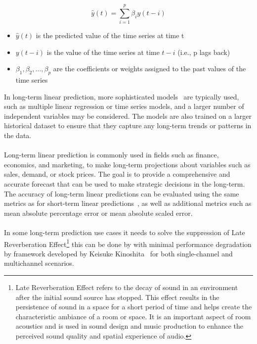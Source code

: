     \begin{equation} \label{eq:ltlp}
        \hat{y}(t) = \sum_{i=1}^{p} \beta_i y(t-i)
    \end{equation}
    \begin{itemize}
        \item $\hat{y}(t)$ is the predicted value of the time series at time t
        \item $y(t-i)$ is the value of the time series at time $t-i$ (i.e., p lags back)
        \item $\beta_1, \beta_2, \dots, \beta_p$ are the coefficients or weights assigned to the past values of the time series
    \end{itemize}
    
    In long-term linear prediction, more sophisticated models~\cite{Nave} are typically used, such as multiple linear regression or time series models,
    and a larger
    number of independent variables may be considered. The models are also trained on a larger historical dataset to ensure that they capture any
    long-term trends or patterns in the data.\\
    \\
    Long-term linear prediction is commonly used in fields such as finance, economics, and marketing, to make long-term projections about variables
    such as sales, demand, or stock prices. The goal is to provide a comprehensive and accurate forecast that can be used to make strategic
    decisions in the long-term. The accuracy of long-term linear predictions can be evaluated using the same metrics as for short-term linear
    predictions~\cite{Baker}, as well as additional metrics such as mean absolute percentage error or mean absolute scaled error.\\
    \\
    In some long-term prediction use cases it needs to solve the suppression of Late Reverberation Effect\footnote{Late Reverberation Effect
    refers to the decay of sound in an environment after the initial sound source has stopped. This effect results in the persistence of
    sound in a space for a short period of time and helps create the characteristic ambiance of a room or space.
    It is an important aspect of room acoustics and is used in sound design and music production to enhance the perceived sound
    quality and spatial experience of audio.} this can be done by with minimal performance degradation by framework developed by Keisuke
    Kinoshita~\cite{Kinoshita} for both single-channel and multichannel scenarios.


